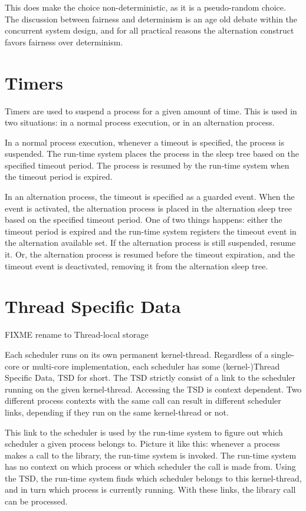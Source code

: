 This does make the choice non\hyp{}deterministic, as it is a pseudo\hyp{}random choice. The discussion between fairness and determinism is an age old debate within the concurrent system design, and for all practical reasons the alternation construct favors fairness over determinism. 


\section{Timers}

Timers are used to suspend a process for a given amount of time. This is used in two situations: in a normal process execution, or in an alternation process. 

In a normal process execution, whenever a timeout is specified, the process is suspended. The run\hyp{}time system places the process in the sleep tree based on the specified timeout period. The process is resumed by the run\hyp{}time system when the timeout period is expired.

In an alternation process, the timeout is specified as a guarded event. When the event is activated, the alternation process is placed in the alternation sleep tree based on the specified timeout period. One of two things happens: either the timeout period is expired and the run\hyp{}time system registers the timeout event in the alternation available set. If the alternation process is still suspended, resume it. Or, the alternation process is resumed before the timeout expiration, and the timeout event is deactivated, removing it from the alternation sleep tree. 


\section{Thread Specific Data}
\label{sec:thread_specific_data}

FIXME rename to Thread\hyp{}local storage

Each scheduler runs on its own permanent kernel\hyp{}thread. Regardless of a single\hyp{}core or multi\hyp{}core implementation, each scheduler has some (kernel\hyp{})Thread Specific Data, TSD for short. The TSD strictly consist of a link to the scheduler running on the given kernel\hyp{}thread. Accessing the TSD is context dependent. Two different process contexts with the same call can result in different scheduler links, depending if they run on the same kernel\hyp{}thread or not. 

This link to the scheduler is used by the run\hyp{}time system to figure out which scheduler a given process belongs to. Picture it like this: whenever a process makes a call to the library, the run\hyp{}time system is invoked. The run\hyp{}time system has no context on which process or which scheduler the call is made from. Using the TSD, the run\hyp{}time system finds which scheduler belongs to this kernel\hyp{}thread, and in turn which process is currently running. With these links, the library call can be processed. 


